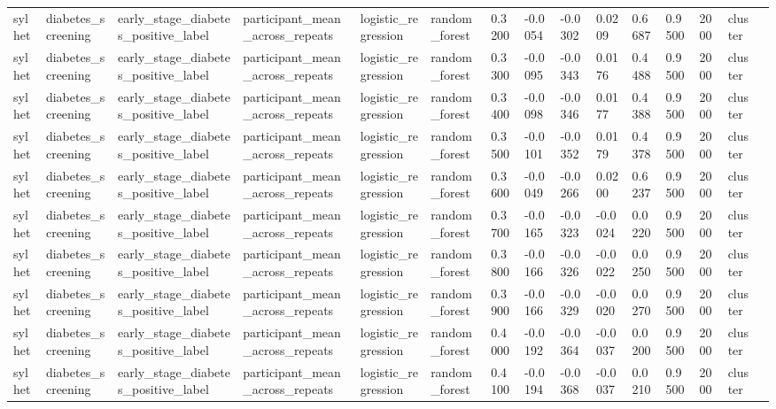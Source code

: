 \begin{tabular}{lllllllllllllll}
sylhet & diabetes\_screening & early\_stage\_diabetes\_positive\_label & participant\_mean\_across\_repeats & logistic\_regression & random\_forest & 0.3200 & -0.0054 & -0.0302 & 0.0209 & 0.6687 & 0.9500 & 2000 & cluster &  \\
sylhet & diabetes\_screening & early\_stage\_diabetes\_positive\_label & participant\_mean\_across\_repeats & logistic\_regression & random\_forest & 0.3300 & -0.0095 & -0.0343 & 0.0176 & 0.4488 & 0.9500 & 2000 & cluster &  \\
sylhet & diabetes\_screening & early\_stage\_diabetes\_positive\_label & participant\_mean\_across\_repeats & logistic\_regression & random\_forest & 0.3400 & -0.0098 & -0.0346 & 0.0177 & 0.4388 & 0.9500 & 2000 & cluster &  \\
sylhet & diabetes\_screening & early\_stage\_diabetes\_positive\_label & participant\_mean\_across\_repeats & logistic\_regression & random\_forest & 0.3500 & -0.0101 & -0.0352 & 0.0179 & 0.4378 & 0.9500 & 2000 & cluster &  \\
sylhet & diabetes\_screening & early\_stage\_diabetes\_positive\_label & participant\_mean\_across\_repeats & logistic\_regression & random\_forest & 0.3600 & -0.0049 & -0.0266 & 0.0200 & 0.6237 & 0.9500 & 2000 & cluster &  \\
sylhet & diabetes\_screening & early\_stage\_diabetes\_positive\_label & participant\_mean\_across\_repeats & logistic\_regression & random\_forest & 0.3700 & -0.0165 & -0.0323 & -0.0024 & 0.0220 & 0.9500 & 2000 & cluster &  \\
sylhet & diabetes\_screening & early\_stage\_diabetes\_positive\_label & participant\_mean\_across\_repeats & logistic\_regression & random\_forest & 0.3800 & -0.0166 & -0.0326 & -0.0022 & 0.0250 & 0.9500 & 2000 & cluster &  \\
sylhet & diabetes\_screening & early\_stage\_diabetes\_positive\_label & participant\_mean\_across\_repeats & logistic\_regression & random\_forest & 0.3900 & -0.0166 & -0.0329 & -0.0020 & 0.0270 & 0.9500 & 2000 & cluster &  \\
sylhet & diabetes\_screening & early\_stage\_diabetes\_positive\_label & participant\_mean\_across\_repeats & logistic\_regression & random\_forest & 0.4000 & -0.0192 & -0.0364 & -0.0037 & 0.0200 & 0.9500 & 2000 & cluster &  \\
sylhet & diabetes\_screening & early\_stage\_diabetes\_positive\_label & participant\_mean\_across\_repeats & logistic\_regression & random\_forest & 0.4100 & -0.0194 & -0.0368 & -0.0037 & 0.0210 & 0.9500 & 2000 & cluster &  \\

\end{tabular}
